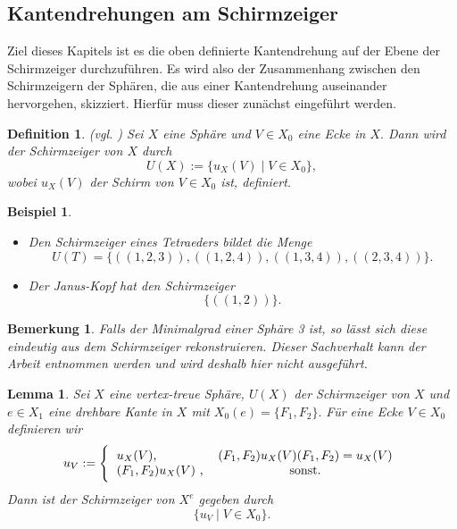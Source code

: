 \documentclass[12pt,titlepage,twoside,cleardoublepage]{article}
\theoremstyle{nummermitklammern}
\newtheorem{lemma}[temp]{Lemma}
\newtheorem{bsp}[temp]{Beispiel}
\newtheorem{definition}[temp]{Definition}
\newtheorem{bemerkung}[temp]{Bemerkung}
\newtheorem{definition}[zahl]{Definition}
\newtheorem{lemma}[zahl]{Lemma}
\newtheorem{bsp}[zahl]{Beispiel}
\newtheorem{bemerkung}[zahl]{Bemerkung}
\numberwithin{equation}{section}
\begin{document}
\subsection{Kantendrehungen am Schirmzeiger}
Ziel dieses Kapitels ist es die oben definierte Kantendrehung auf der Ebene der Schirmzeiger durchzuführen. Es wird also der Zusammenhang zwischen den Schirmzeigern der Sphären, die aus einer Kantendrehung auseinander hervorgehen, skizziert. Hierfür muss dieser zunächst eingeführt werden.

\begin{definition}{(vgl. \textsc{\cite{simp})}}
Sei $X$ eine Sphäre und $V\in X_0$ eine Ecke in $X.$ Dann wird der \emph{Schirmzeiger} von $X$ durch 
\[
U(X):=\{u_X(V) \mid V\in X_0\},
\]
wobei $u_X(V)$ der Schirm von $V\in X_0$ ist, definiert.
\end{definition}
\begin{bsp}
\begin{itemize}
\item 
Den Schirmzeiger eines Tetraeders bildet die Menge 
\[
U(T)=\{ ((1,2,3)),((1,2,4)),((1,3,4)),((2,3,4))\}.
\]
\item Der Janus-Kopf hat den Schirmzeiger 
\[
\{((1,2))\}.
\]
\end{itemize}
\end{bsp}
\begin{bemerkung}
Falls der Minimalgrad einer Sphäre 3 ist, so lässt sich diese eindeutig aus dem Schirmzeiger rekonstruieren. Dieser Sachverhalt kann der Arbeit {\textsc{\cite{simp}}} entnommen werden und wird deshalb hier nicht ausgeführt.
\end{bemerkung}
\begin{lemma}
Sei $X$ eine vertex-treue Sphäre, $U(X)$ der Schirmzeiger von $X$ und $e\in X_1$ eine drehbare Kante in $X$ mit $X_0(e)=\{F_1,F_2\}.$ Für eine Ecke $V\in X_0$ definieren wir  
\[
u_V:=
\Biggl\{
\begin{tabular}[l]{lcr}
\text{$u_X(V)$},&$(F_1,F_2)u_X(V)(F_1,F_2)=u_X(V)$ \\
$(F_1,F_2) u_X(V)$ ,& sonst. \\

\end{tabular}
\]
Dann ist der Schirmzeiger von $X^e$ gegeben durch 
\[
\{ u_V\mid V \in X_0\}.
\]
\end{lemma}
\end{document}
